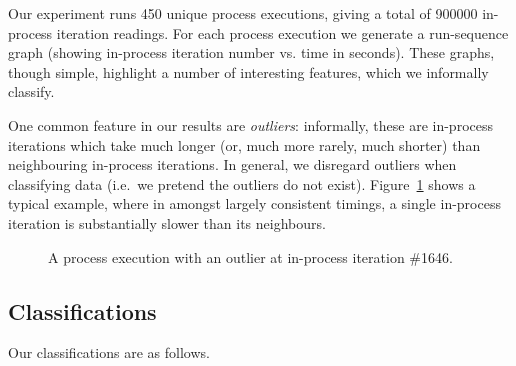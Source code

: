 \documentclass[a4paper,UKenglish]{lipics}
\begin{document}
Our experiment runs 450 unique process executions, giving a total of 900000
in-process iteration readings. For each process execution  we generate a
run-sequence graph (showing in-process iteration number vs. time in seconds).
These graphs, though simple, highlight a number of
interesting features, which we informally classify.

One common feature in our results are \emph{outliers}: informally, these are
in-process iterations which take much longer (or, much more rarely, much
shorter) than neighbouring in-process iterations. In general, we disregard outliers
when classifying data (i.e.~we pretend the outliers do not exist). Figure~\ref{fig:examples:outliers1}
shows a typical
example, where in amongst largely consistent timings, a single in-process
iteration is substantially slower than its neighbours.


\begin{figure}[tbp]
\caption{A process execution with an outlier at in-process iteration \#1646.}
\label{fig:examples:outliers1}
\end{figure}


\subsection{Classifications}

Our classifications are as follows.
\end{document}
